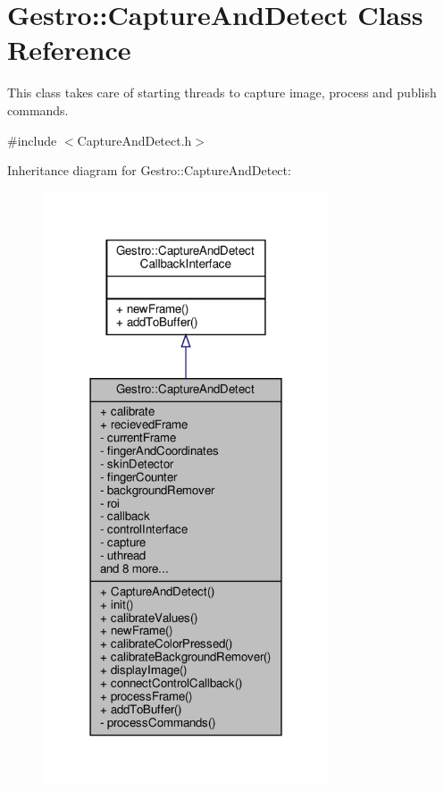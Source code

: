 \hypertarget{class_gestro_1_1_capture_and_detect}{}\section{Gestro\+:\+:Capture\+And\+Detect Class Reference}
\label{class_gestro_1_1_capture_and_detect}


This class takes care of starting threads to capture image, process and publish commands.  




{\ttfamily \#include $<$Capture\+And\+Detect.\+h$>$}



Inheritance diagram for Gestro\+:\+:Capture\+And\+Detect\+:
\nopagebreak
\begin{figure}[H]
\begin{center}
\leavevmode
\includegraphics[width=240pt]{class_gestro_1_1_capture_and_detect__inherit__graph}
\end{center}
\end{figure}


